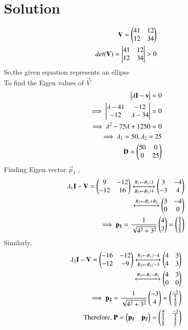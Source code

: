 \documentclass[journal,12pt,twocolumn]{IEEEtran}
\begin{document}
\section{Solution}
\begin{align}
  \mathbf{V}=\begin{pmatrix}41&12\\12&34\end{pmatrix}\\
  det(\mathbf{V} )=\begin{vmatrix}41&12\\12&34\end{vmatrix}>0
\end{align}
So,the given equation represents an ellipse\\
To find the Eigen values of $\vec{V}$
\begin{align}
    \begin{vmatrix}\lambda\mathbf{I}-\mathbf{v}\end{vmatrix}=0\\
    \implies \begin{vmatrix}\lambda-41&-12\\-12&\lambda-34\end{vmatrix}=0\\
    \implies \lambda^2-75\lambda+1250=0\\
    \implies \lambda_1=50,\lambda_2=25\\
    \mathbf{D}=\begin{pmatrix}50&0\\0&25\end{pmatrix}
\end{align}
Finding Eigen vector $\vec{p}_1$ ,
\begin{align}
\lambda_1\mathbf{I}-\mathbf{V}= \begin{pmatrix}9&-12\\-12&16\end{pmatrix}\xleftrightarrow[R_2\leftarrow R_2/4]{R_1\leftarrow R_1/3}\begin{pmatrix}3&-4\\-3&4\end{pmatrix}\\
\xleftrightarrow[]{R_2\leftarrow R_1+R_2}\begin{pmatrix}3&-4\\0&0\end{pmatrix}\\
\implies \mathbf{p_1}=\frac{1}{\sqrt{4^2+3^2}}\begin{pmatrix}4\\3\end{pmatrix}=\begin{pmatrix}\frac{4}{5}\\\frac{3}{5}\end{pmatrix}
\end{align}
Similarly,
\begin{align}
  \lambda_2\mathbf{I}-\mathbf{V}= \begin{pmatrix}-16&-12\\-12&-9\end{pmatrix}\xleftrightarrow[R_2\leftarrow R_2/-3]{R_1\leftarrow R_1/-4}\begin{pmatrix}4&3\\4&3\end{pmatrix}\\
\xleftrightarrow[]{R_2\leftarrow R_1-R_2}\begin{pmatrix}4&3\\0&0\end{pmatrix}\\
\implies \mathbf{p_2}=\frac{1}{\sqrt{4^2+3^2}}\begin{pmatrix}-3\\4\end{pmatrix}=\begin{pmatrix}\frac{-3}{5}\\\frac{4}{5}\end{pmatrix}\\\text{ Therefore, } \mathbf{P}=\begin{pmatrix}\mathbf{p_1}&\mathbf{p_2}\end{pmatrix}=\begin{pmatrix}\frac{4}{5}&\frac{-3}{5}\\ \frac{3}{5}&\frac{4}{5}\end{pmatrix}
\end{align}
\end{document}
